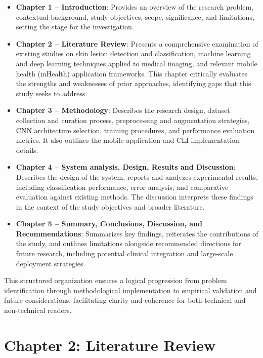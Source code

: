 \documentclass[
  12pt,
  oneside]{article}
\providecommand{\tightlist}{%
  \setlength{\itemsep}{0pt}\setlength{\parskip}{0pt}}
\begin{document}
\begin{itemize}
\tightlist
\item
  \textbf{Chapter 1 -- Introduction}: Provides an overview of the
  research problem, contextual background, study objectives, scope,
  significance, and limitations, setting the stage for the
  investigation.
\item
  \textbf{Chapter 2 -- Literature Review}: Presents a comprehensive
  examination of existing studies on skin lesion detection and
  classification, machine learning and deep learning techniques applied
  to medical imaging, and relevant mobile health (mHealth) application
  frameworks. This chapter critically evaluates the strengths and
  weaknesses of prior approaches, identifying gaps that this study seeks
  to address.
\item
  \textbf{Chapter 3 -- Methodology}: Describes the research design,
  dataset collection and curation process, preprocessing and
  augmentation strategies, CNN architecture selection, training
  procedures, and performance evaluation metrics. It also outlines the
  mobile application and CLI implementation details.
\item
  \textbf{Chapter 4 -- System analysis, Design, Results and Discussion}:
  Describes the design of the system, reports and analyzes experimental
  results, including classification performance, error analysis, and
  comparative evaluation against existing methods. The discussion
  interprets these findings in the context of the study objectives and
  broader literature.
\item
  \textbf{Chapter 5 -- Summary, Conclusions, Discussion, and
  Recommendations}: Summarizes key findings, reiterates the
  contributions of the study, and outlines limitations alongside
  recommended directions for future research, including potential
  clinical integration and large-scale deployment strategies.
\end{itemize}

This structured organization ensures a logical progression from problem
identification through methodological implementation to empirical
validation and future considerations, facilitating clarity and coherence
for both technical and non-technical readers.

\newpage

\section{Chapter 2: Literature
Review}\label{chapter-2-literature-review}
\end{document}
